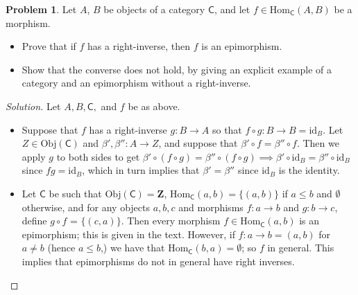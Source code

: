 \documentclass[fontsize=14pt]{scrartcl}
\theoremstyle{definition}
\newtheorem{problem-internal}{Problem}[subsection]
\newenvironment{problem}{
  \medskip
  \begin{problem-internal}
}{
  \end{problem-internal}
}
\newenvironment{solution}{
  \begin{proof}[Solution]
  \vspace{-8px}
  \setlength{\parskip}{4px}
  \setlength{\parindent}{0px}
}{
  \end{proof}
}
\newcommand{\id}{\mathrm{id}}
\newcommand{\Obj}{\mathrm{Obj}}
\newcommand{\Hom}{\mathrm{Hom}}
\begin{document}
\begin{problem}
\def \C {\mathsf{C}}
Let $A$, $B$ be objects of a category $\C$, and let $f \in \Hom_\C(A, B)$ be a
morphism. 
\begin{itemize}
\item Prove that if $f$ has a right-inverse, then $f$ is an epimorphism.
\item Show that the converse does not hold, by giving an explicit example of a
category and an epimorphism without a right-inverse.
\end{itemize}
\end{problem}

\begin{solution}
\def \C {\mathsf{C}}

Let $A,B,\C,$ and $f$ be as above.
\begin{itemize}
\item Suppose that $f$ has a right-inverse $g:B\to A$ so that $f\circ g: B\to B
= \id_B$. Let $Z\in\Obj(\C)$ and $\beta',\beta'':A\to Z$, and suppose that
$\beta'\circ f=\beta''\circ f$. Then we apply $g$ to both sides to get
$\beta'\circ(f\circ g) = \beta''\circ(f\circ g) \implies \beta'\circ\id_B =
\beta''\circ \id_B$ since $fg=\id_B$, which in turn implies that
$\beta'=\beta''$ since $\id_B$ is the identity.

\item Let $\C$ be such that $\Obj(\C) = \mathbf{Z}$, $\Hom_\C(a,b)=\{(a,b)\}$ if
$a\leq b$ and $\emptyset$ otherwise, and for any objects $a,b,c$ and morphisms
$f:a\to b$ and $g:b\to c$, define $g\circ f$ = $\{(c,a)\}$. Then every morphism
$f\in\Hom_\C(a,b)$ is an epimorphism; this is given in the text. However, if
$f:a\to b = (a,b)$ for $a\neq b$ (hence $a\leq b$,) we have that
$\Hom_\C(b,a)=\emptyset$; so $f$ in general. This implies that epimorphisms do
not in general have right inverses.
\end{itemize}
\end{solution}
\end{document}
